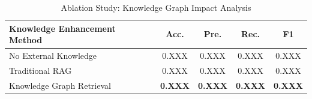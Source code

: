 \begin{table}[!t]
\centering
\caption{Ablation Study: Knowledge Graph Impact Analysis}
\label{tab:knowledge_ablation}
\begin{tabular}{@{}lcccc@{}}
\toprule
\textbf{Knowledge Enhancement Method} & \textbf{Acc.} & \textbf{Pre.} & \textbf{Rec.} & \textbf{F1} \\
\midrule
No External Knowledge & 0.XXX & 0.XXX & 0.XXX & 0.XXX \\
Traditional RAG & 0.XXX & 0.XXX & 0.XXX & 0.XXX \\
Knowledge Graph Retrieval & \textbf{0.XXX} & \textbf{0.XXX} & \textbf{0.XXX} & \textbf{0.XXX} \\
\bottomrule
\end{tabular}
\end{table}
